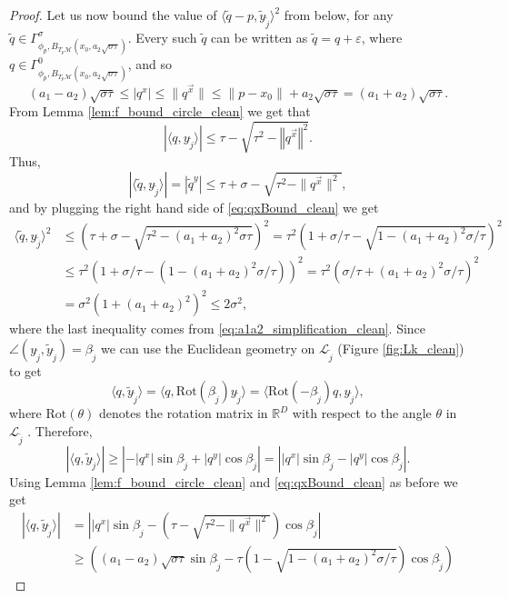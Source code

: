 \documentclass[12pt]{article}
\theoremstyle{remark}
\newcommand{\RR}{\mathbb{R}}
\newcommand{\MM}{\mathcal{M}}
\newcommand{\LL}{\mathcal{L}}
\newcommand{\eps}{\varepsilon}
\newcommand{\abs}[1]{\left\vert #1 \right\vert}
\newcommand{\norm}[1]{\left\Vert #1 \right\Vert}
\newcommand{\lrangle}[1]{\langle #1 \rangle}
\begin{document}
\begin{appendices}
\begin{proof}
Let us now bound the value of $\lrangle{\tilde q - p, \tilde y_{\tilde j}}^2$ from below, for any $\tilde  q\in \Gamma^\sigma_{\phi_p,B_{T_p\MM}(x_0, a_2\sqrt{\sigma\tau})}$.
Every such $\tilde  q$ can be written as
$
\tilde q = q + \eps
$,
where $q\in \Gamma^0_{\phi_p,B_{T_p\MM}(x_0, a_2\sqrt{\sigma\tau})}$, and so 
 \begin{equation}\label{eq:qxBound_clean}
 (a_1 - a_2)\sqrt{\sigma\tau}  \leq \abs{q^x} \leq \|q^{\vec{x}}\| \leq \|p-x_0\|+a_2\sqrt{\sigma\tau} = (a_1 + a_2)\sqrt{\sigma\tau}   
.\end{equation}
From Lemma \ref{lem:f_bound_circle_clean} we get that
\[
\abs{\lrangle{q, y_{\tilde j}}} \leq \tau-\sqrt{\tau^2-\norm{q^{\vec{x}}}^2} 
.\]
Thus, 
\[
\abs{\langle \tilde{q}, y_{\tilde j} \rangle} = |\tilde{q}^y| \leq \tau+\sigma-\sqrt{\tau^2-\|q^{\vec{x}}\|^2}
,\]
and by plugging the right hand side of \eqref{eq:qxBound_clean} we get
\begin{align*}
\langle \tilde{q}, y_{\tilde j} \rangle^2 & \leq \left(\tau+ \sigma -\sqrt{\tau^2-(a_1+a_2)^2\sigma\tau}\right)^2
 =\tau^2 \left(1+ \sigma/\tau -\sqrt{1-(a_1+a_2)^2\sigma/\tau}\right)^2
\\&\leq \tau^2(1+\sigma/\tau -(1-(a_1+a_2)^2\sigma/\tau))^2
= \tau^2 (\sigma/\tau +  (a_1+a_2)^2\sigma/\tau)^2
\\&=  \sigma^2(1 +  (a_1+a_2)^2)^2
\leq 2\sigma^2
,\end{align*}
where the last inequality comes from \eqref{eq:a1a2_simplification_clean}.
Since $\angle(y_{\tilde j}, \tilde y_{\tilde j}) =\beta_{\tilde j} $ we can use the Euclidean geometry on $\LL_{\tilde j}$ (Figure \ref{fig:Lk_clean}) to get
\[
\lrangle{q, \tilde y_{\tilde j}} = \lrangle{q, \textrm{Rot}(\beta_{\tilde j}) y_{\tilde j}} = \lrangle{\textrm{Rot}(-\beta_{\tilde j}) q,  y_{\tilde j}}
,\]
where $\textrm{Rot}(\theta)$ denotes the rotation matrix in $\RR^D$ with respect to the angle $\theta$ in $\LL_{\tilde j}$ .
Therefore,
$$|\langle q, \tilde{y}_{\tilde j} \rangle| \geq \abs{-|q^x|\sin \beta_{\tilde j}  + |q^y|\cos \beta_{\tilde j}} = \abs{|q^x|\sin \beta_{\tilde j}  - |q^y|\cos \beta_{\tilde j}}.$$
Using Lemma \ref{lem:f_bound_circle_clean} and \eqref{eq:qxBound_clean} as before we get
\begin{align*}
 |\langle q, \tilde{y}_{\tilde j} \rangle| &=\abs{  |q^x|\sin \beta_{\tilde j}  -  \left(\tau-\sqrt{\tau^2-\|q^{\vec{x}}\|^2} \right)\cos \beta_{\tilde j}}
 \\
 &\geq\left((a_1-a_2)\sqrt{\sigma\tau}\sin \beta_{\tilde j}  -  \tau\left(1-\sqrt{1- (a_1+a_2)^2\sigma/\tau} \right)\cos \beta_{\tilde j} \right)

\end{align*}
\end{proof}
\end{appendices}
\end{document}
